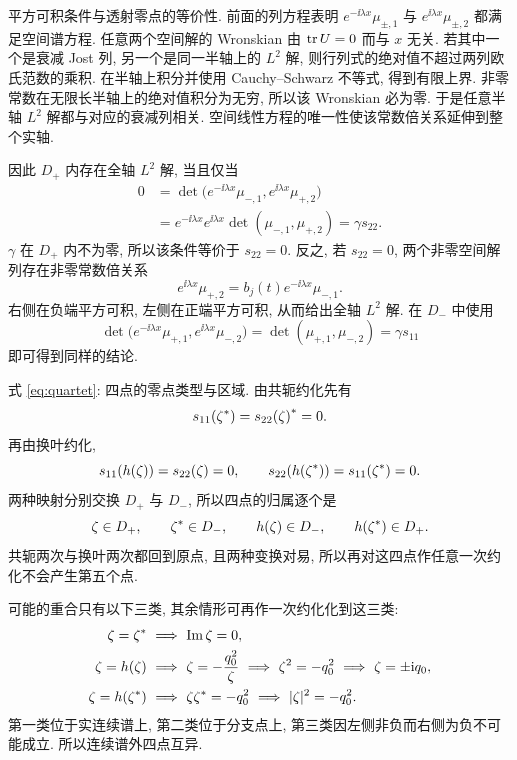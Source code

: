 \par\smallskip\noindent 平方可积条件与透射零点的等价性.\quad
前面的列方程表明 $e^{-\ii\lambda x}\mu_{\pm,1}$ 与
$e^{\ii\lambda x}\mu_{\pm,2}$ 都满足空间谱方程.
任意两个空间解的 Wronskian 由 $\operatorname{tr} U=0$ 而与 $x$ 无关.
若其中一个是衰减 Jost 列, 另一个是同一半轴上的 $L^2$ 解,
则行列式的绝对值不超过两列欧氏范数的乘积.
在半轴上积分并使用 Cauchy--Schwarz 不等式, 得到有限上界.
非零常数在无限长半轴上的绝对值积分为无穷, 所以该 Wronskian 必为零.
于是任意半轴 $L^2$ 解都与对应的衰减列相关.
空间线性方程的唯一性使该常数倍关系延伸到整个实轴.

因此 $D_+$ 内存在全轴 $L^2$ 解, 当且仅当
\begin{align*}
0&=\det\bigl(e^{-\ii\lambda x}\mu_{-,1},
 e^{\ii\lambda x}\mu_{+,2}\bigr)\\
&=e^{-\ii\lambda x}e^{\ii\lambda x}
\det(\mu_{-,1},\mu_{+,2})
=\gamma s_{22}.
\end{align*}
$\gamma$ 在 $D_+$ 内不为零, 所以该条件等价于 $s_{22}=0$.
反之, 若 $s_{22}=0$, 两个非零空间解列存在非零常数倍关系
\begin{equation*}
e^{\ii\lambda x}\mu_{+,2}
=b_j(t)e^{-\ii\lambda x}\mu_{-,1}.
\end{equation*}
右侧在负端平方可积, 左侧在正端平方可积, 从而给出全轴 $L^2$ 解.
在 $D_-$ 中使用
\begin{equation*}
\det\bigl(e^{-\ii\lambda x}\mu_{+,1},
 e^{\ii\lambda x}\mu_{-,2}\bigr)
=\det(\mu_{+,1},\mu_{-,2})=\gamma s_{11}
\end{equation*}
即可得到同样的结论.

\par\smallskip\noindent 式 \eqref{eq:quartet}: 四点的零点类型与区域.\quad
由共轭约化先有
\begin{equation*}
s_{11}({\zeta}^{*})={s_{22}(\zeta)}^{*}=0.
\end{equation*}
再由换叶约化,
\begin{equation*}
s_{11}(h(\zeta))=s_{22}(\zeta)=0,
\qquad
s_{22}(h({\zeta}^{*}))=s_{11}({\zeta}^{*})=0.
\end{equation*}
两种映射分别交换 $D_+$ 与 $D_-$,
所以四点的归属逐个是
\begin{equation*}
\zeta\in D_+,
\qquad {\zeta}^{*}\in D_-,
\qquad h(\zeta)\in D_-,
\qquad h({\zeta}^{*})\in D_+.
\end{equation*}
共轭两次与换叶两次都回到原点, 且两种变换对易,
所以再对这四点作任意一次约化不会产生第五个点.

可能的重合只有以下三类, 其余情形可再作一次约化化到这三类:
\begin{align*}
\zeta={\zeta}^{*}
&\ \Longrightarrow\ \operatorname{Im}\zeta=0,\\
\zeta=h(\zeta)
&\ \Longrightarrow\ \zeta=-\dfrac{q_0^2}{\zeta}
\ \Longrightarrow\ \zeta^2=-q_0^2
\ \Longrightarrow\ \zeta=\pm\mathrm{i} q_0,\\
\zeta=h({\zeta}^{*})
&\ \Longrightarrow\ \zeta{\zeta}^{*}=-q_0^2
\ \Longrightarrow\ |\zeta|^2=-q_0^2.
\end{align*}
第一类位于实连续谱上, 第二类位于分支点上,
第三类因左侧非负而右侧为负不可能成立.
所以连续谱外四点互异.

